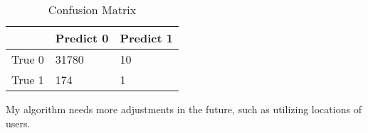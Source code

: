 \begin{table}
    \centering
    \caption{Confusion Matrix}\label{tbl:confusion}
    \begin{tabular}{p{1.5in}p{1.5in}p{1.5in}}\toprule
               & Predict 0 & Predict 1 \\ \midrule
        True 0 &    31780  &      10  \\
        True 1 &      174  &       1   \\ \bottomrule
    \end{tabular}
\end{table}

My algorithm needs more adjustments in the future, such as utilizing locations of users.

%
%



